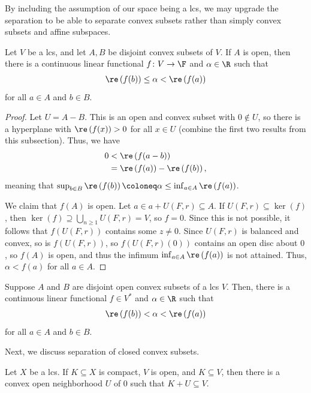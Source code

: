 \documentclass[10pt]{mypackage}
\begin{document}
By including the assumption of our space being a lcs, we may upgrade the separation to be able to separate convex subsets rather than simply convex subsets and affine subspaces.
\begin{theorem}
  Let $V$ be a lcs, and let $A,B$ be disjoint convex subsets of $V$. If $A$ is open, then there is a continuous linear functional $f\colon V\rightarrow \F$ and $\alpha\in \R$ such that
  \begin{align*}
    \re\left( f(b) \right) \leq \alpha < \re\left( f(a) \right)
  \end{align*}
  for all $a\in A$ and $b\in B$.
\end{theorem}
\begin{proof}
  Let $U = A - B$. This is an open and convex subset with $0\notin U$, so there is a hyperplane with $\re\left( f(x) \right) > 0$ for all $x\in U$ (combine the first two results from this subsection). Thus, we have
  \begin{align*}
    0 &< \re\left( f(a-b) \right)\\
      &= \re\left( f(a) \right) - \re\left( f(b) \right),
  \end{align*}
  meaning that $\sup_{b\in B}\re\left( f(b) \right) \coloneq \alpha \leq \inf_{a\in A}\re\left( f(a) \right)$.

  We claim that $f(A)$ is open. Let $a\in a + U\left( F,r \right)\subseteq A$. If $U\left( F,r \right)\subseteq \ker\left( f \right)$, then $\ker\left( f \right) \supseteq \bigcup_{n\geq 1}U\left( F,r \right) = V$, so $f = 0$. Since this is not possible, it follows that $f\left( U\left( F,r \right) \right)$ contains some $z\neq 0$. Since $U\left( F,r \right)$ is balanced and convex, so is $f\left( U\left( F,r \right) \right)$, so $f\left( U\left( F,r \right)(0) \right)$ contains an open disc about $0$, so $f(A)$ is open, and thus the infimum $\inf_{a\in A}\re\left( f(a) \right)$ is not attained. Thus, $\alpha < f(a)$ for all $a\in A$.
\end{proof}
\begin{corollary}
  Suppose $A$ and $B$ are disjoint open convex subsets of a lcs $V$. Then, there is a continuous linear functional $f\in V^{\ast}$ and $\alpha\in \R$ such that
  \begin{align*}
    \re\left( f(b) \right) < \alpha < \re\left( f(a) \right)
  \end{align*}
  for all $a\in A$ and $b\in B$.
\end{corollary}
Next, we discuss separation of closed convex subsets.
\begin{lemma}
  Let $X$ be a lcs. If $K\subseteq X$ is compact, $V$ is open, and $K\subseteq V$, then there is a convex open neighborhood $U$ of $0$ such that $K + U \subseteq V$.
\end{lemma}
\end{document}
